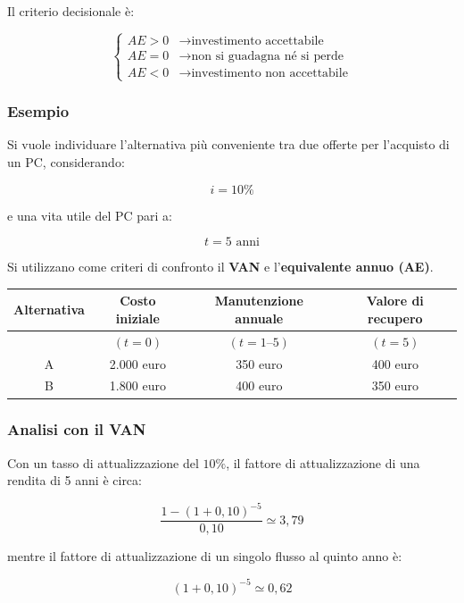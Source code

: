 \noindent Il criterio decisionale è:

\[
\begin{cases}
AE > 0 & \rightarrow \text{investimento accettabile} \\[2mm]
AE = 0 & \rightarrow \text{non si guadagna né si perde} \\[2mm]
AE < 0 & \rightarrow \text{investimento non accettabile}
\end{cases}
\]

\subsubsection*{Esempio}

\noindent Si vuole individuare l'alternativa più conveniente tra due offerte
per l'acquisto di un PC, considerando:

\[
i = 10\%
\]

\noindent e una vita utile del PC pari a:

\[
t = 5 \text{ anni}
\]

\noindent Si utilizzano come criteri di confronto il \textbf{VAN} e
l'\textbf{equivalente annuo (AE)}.

\begin{center}
\begin{tabular}{|c|c|c|c|}
\hline
\textbf{Alternativa} &
\textbf{Costo iniziale} &
\textbf{Manutenzione annuale} &
\textbf{Valore di recupero} \\
\hline
 & $(t=0)$ & $(t=1\text{--}5)$ & $(t=5)$ \\
\hline
A & 2.000 euro & 350 euro & 400 euro \\
\hline
B & 1.800 euro & 400 euro & 350 euro \\
\hline
\end{tabular}
\end{center}

\subsubsection*{Analisi con il VAN}

\noindent Con un tasso di attualizzazione del $10\%$, il fattore di attualizzazione
di una rendita di 5 anni è circa:

\[
\frac{1-(1+0,10)^{-5}}{0,10} \simeq 3,79
\]

\noindent mentre il fattore di attualizzazione di un singolo flusso al quinto anno è:

\[
(1+0,10)^{-5} \simeq 0,62
\]

